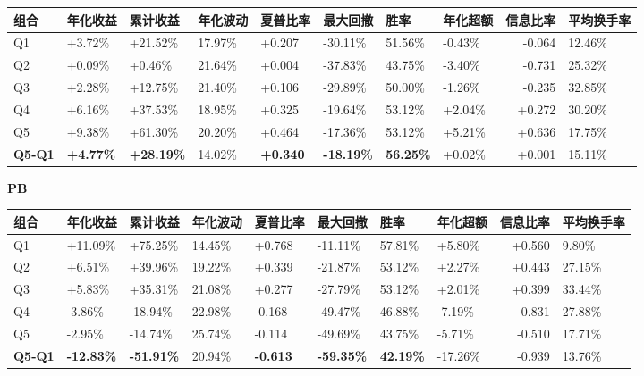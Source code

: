 \documentclass[UTF8,a4paper,11pt]{ctexart}
\begin{document}
\begin{table}[htbp]
\centering
\footnotesize
\begin{tabularx}{\textwidth}{@{}YYYYYYYYRY@{}}
\toprule
组合 & 年化收益 & 累计收益 & 年化波动 & 夏普比率 & 最大回撤 & 胜率 & 年化超额 & 信息比率 & 平均换手率 \\
\midrule
Q1 & +3.72\% & +21.52\% & 17.97\% & +0.207 & -30.11\% & 51.56\% & -0.43\% & -0.064 & 12.46\% \\
Q2 & +0.09\% & +0.46\% & 21.64\% & +0.004 & -37.83\% & 43.75\% & -3.40\% & -0.731 & 25.32\% \\
Q3 & +2.28\% & +12.75\% & 21.40\% & +0.106 & -29.89\% & 50.00\% & -1.26\% & -0.235 & 32.85\% \\
Q4 & +6.16\% & +37.53\% & 18.95\% & +0.325 & -19.64\% & 53.12\% & +2.04\% & +0.272 & 30.20\% \\
Q5 & +9.38\% & +61.30\% & 20.20\% & +0.464 & -17.36\% & 53.12\% & +5.21\% & +0.636 & 17.75\% \\
\textbf{Q5-Q1} & \textbf{+4.77\%} & \textbf{+28.19\%} & 14.02\% & \textbf{+0.340} & \textbf{-18.19\%} & \textbf{56.25\%} & +0.02\% & +0.001 & 15.11\% \\
\bottomrule
\end{tabularx}
\end{table}

\textbf{PB}

\begin{table}[htbp]
\centering
\footnotesize
\begin{tabularx}{\textwidth}{@{}YYYYYYYYRY@{}}
\toprule
组合 & 年化收益 & 累计收益 & 年化波动 & 夏普比率 & 最大回撤 & 胜率 & 年化超额 & 信息比率 & 平均换手率 \\
\midrule
Q1 & +11.09\% & +75.25\% & 14.45\% & +0.768 & -11.11\% & 57.81\% & +5.80\% & +0.560 & 9.80\% \\
Q2 & +6.51\% & +39.96\% & 19.22\% & +0.339 & -21.87\% & 53.12\% & +2.27\% & +0.443 & 27.15\% \\
Q3 & +5.83\% & +35.31\% & 21.08\% & +0.277 & -27.79\% & 53.12\% & +2.01\% & +0.399 & 33.44\% \\
Q4 & -3.86\% & -18.94\% & 22.98\% & -0.168 & -49.47\% & 46.88\% & -7.19\% & -0.831 & 27.88\% \\
Q5 & -2.95\% & -14.74\% & 25.74\% & -0.114 & -49.69\% & 43.75\% & -5.71\% & -0.510 & 17.71\% \\
\textbf{Q5-Q1} & \textbf{-12.83\%} & \textbf{-51.91\%} & 20.94\% & \textbf{-0.613} & \textbf{-59.35\%} & \textbf{42.19\%} & -17.26\% & -0.939 & 13.76\% \\
\bottomrule
\end{tabularx}
\end{table}
\end{document}
